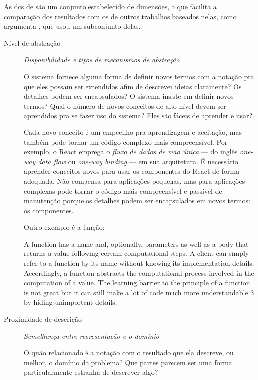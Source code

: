As \glspl{dc} de \textcite{green1989} são um conjunto estabelecido de
dimensões, o que facilita a comparação dos resultados com os de outros
trabalhos baseados nelas, como argumenta \textcite[p. 12]{kiss2014},
que usou um subconjunto delas.

\begin{description}
\item[{Nível de abstração}] \emph{Disponibilidade e tipos de mecanismos de abstração}

O sistema fornece alguma forma de definir novos termos com a notação pra
que eles possam ser extendidos afim de descrever ideias claramente? Os
detalhes podem ser encapsulados? O sistema insiste em definir novos
termos? Qual o número de novos conceitos de alto nível devem ser
aprendidos pra se fazer uso do sistema? Eles são fáceis de aprender e
usar?

   Cada novo conceito é um empecilho pra aprendizagem e aceitação, mas
também pode tornar um código complexo mais compreensível. Por exemplo, o
React emprega o \emph{fluxo de dados de mão única} --- do inglês \emph{one-way data
flow} ou \emph{one-way binding} --- em sua arquitetura. É necessário aprender
conceitos novos para usar os componentes do React de forma adequada. Não
compensa para aplicações pequenas, mas para aplicações complexas pode tornar
o código mais compreensível e passível de manutenção porque os detalhes
podem ser encapsulados em novos termos: os componentes.

Outro exemplo é a função:

\begin{citacao}
  A function has a name and, optionally, parameters as well as a body that
  returns a value following certain computational steps. A client can simply
  refer to a function by its name without knowing its implementation details.
  Accordingly, a function abstracts the computational process involved in the
  computation of a value. The learning barrier to the principle of a function is
  not great but it can still make a lot of code much more understandable 3 by
  hiding unimportant details.
  \cite[p.~13]{kiss2014}
\end{citacao}

\item[{Proximidade de descrição}]  \emph{Semelhança entre representação e o domínio}

O quão relacionado é a notação com o resultado que ela descreve, ou
melhor, o domínio do problema? Que partes parecem ser uma forma
particularmente estranha de descrever algo?


\end{description}

